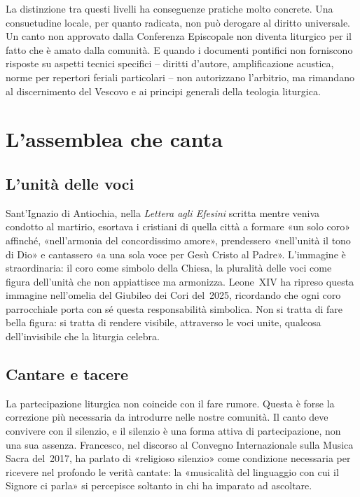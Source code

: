 \documentclass[12pt,a4paper]{article}
\begin{document}
	La distinzione tra questi livelli ha conseguenze pratiche molto concrete. Una
	consuetudine locale, per quanto radicata, non può derogare al diritto universale.
	Un canto non approvato dalla Conferenza Episcopale non diventa liturgico per il
	fatto che è amato dalla comunità. E quando i documenti pontifici non forniscono
	risposte su aspetti tecnici specifici -- diritti d'autore, amplificazione
	acustica, norme per repertori feriali particolari -- non autorizzano l'arbitrio,
	ma rimandano al discernimento del Vescovo e ai principi generali della teologia
	liturgica.
	
	\section{L'assemblea che canta}
	
	\subsection{L'unità delle voci}
	
	Sant'Ignazio di Antiochia, nella \emph{Lettera agli Efesini} scritta mentre
	veniva condotto al martirio, esortava i cristiani di quella città a formare «un
	solo coro» affinché, «nell'armonia del concordissimo amore», prendessero
	«nell'unità il tono di Dio» e cantassero «a una sola voce per Gesù Cristo al
	Padre». L'immagine è straordinaria: il coro come simbolo della Chiesa, la
	pluralità delle voci come figura dell'unità che non appiattisce ma armonizza.
	Leone~XIV ha ripreso questa immagine nell'omelia del Giubileo dei Cori del~2025,
	ricordando che ogni coro parrocchiale porta con sé questa responsabilità
	simbolica. Non si tratta di fare bella figura: si tratta di rendere visibile,
	attraverso le voci unite, qualcosa dell'invisibile che la liturgia celebra.
	
	\subsection{Cantare e tacere}
	
	La partecipazione liturgica non coincide con il fare rumore. Questa è forse la
	correzione più necessaria da introdurre nelle nostre comunità. Il canto deve
	convivere con il silenzio, e il silenzio è una forma attiva di partecipazione,
	non una sua assenza. Francesco, nel discorso al Convegno Internazionale sulla
	Musica Sacra del~2017, ha parlato di «religioso silenzio» come condizione
	necessaria per ricevere nel profondo le verità cantate: la «musicalità del
	linguaggio con cui il Signore ci parla» si percepisce soltanto in chi ha
	imparato ad ascoltare.
	
\end{document}
